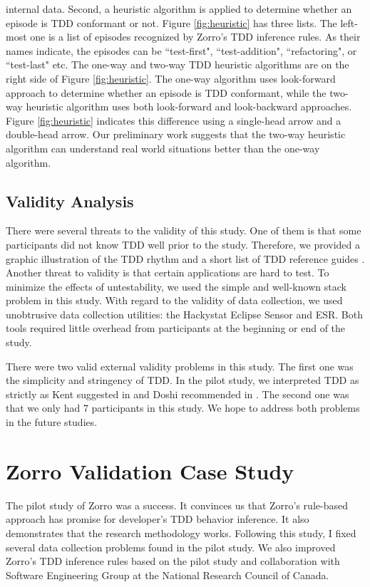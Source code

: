 internal data. Second, a heuristic algorithm is applied to determine
whether an episode is TDD conformant or not. Figure
\ref{fig:heuristic} has three lists. The left-most one is a list of
episodes recognized by Zorro's TDD inference rules. As their names
indicate, the episodes can be ``test-first", ``test-addition",
``refactoring", or ``test-last" etc. The one-way and two-way TDD
heuristic algorithms are on the right side of Figure
\ref{fig:heuristic}. The one-way algorithm uses look-forward approach
to determine whether an episode is TDD conformant, while the two-way
heuristic algorithm uses both look-forward and look-backward
approaches. Figure \ref{fig:heuristic} indicates this difference using
a single-head arrow and a double-head arrow. Our preliminary work suggests 
that the two-way heuristic algorithm can understand real world situations
better than the one-way algorithm.

\subsection{Validity Analysis}
There were several threats to the validity of this study. One of them
is that some participants did not know TDD well prior to the
study. Therefore, we provided a graphic illustration of the TDD rhythm
\cite{TDDRhythm} and a short list of TDD reference guides
\cite{TDDQuickReference}.  Another threat to validity is that certain
applications are hard to test. To minimize the effects of
untestability, we used the simple and well-known stack problem in this
study. With regard to the validity of data collection, we used
unobtrusive data collection utilities: the Hackystat Eclipse Sensor
and ESR. Both tools required little overhead from participants
\cite{csdl2-03-12,Hackystat} at the beginning or end of the study.

There were two valid external validity problems in this study. The
first one was the simplicity and stringency of TDD. In the pilot
study, we interpreted TDD as strictly as Kent suggested in
\cite{Beck:01,Beck:03} and Doshi recommended in
\cite{TDDRhythm,TDDQuickReference}. The second one was that we only
had 7 participants in this study. We hope to address both problems in
the future studies.

\section{Zorro Validation Case Study}
The pilot study of Zorro was a success. It convinces us that Zorro's
rule-based approach has promise for developer's TDD behavior
inference. It also demonstrates that the research methodology works.
Following this study, I fixed several data collection problems found
in the pilot study. We also improved Zorro's TDD inference rules
based on the pilot study and collaboration with Software
Engineering Group at the National Research Council of Canada.

